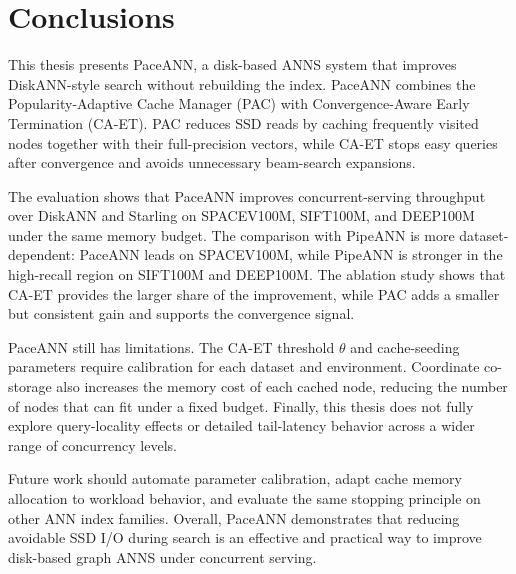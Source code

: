 \chapter{Conclusions}
\label{ch:conclusion}

This thesis presents PaceANN, a disk-based ANNS system that improves DiskANN-style search without rebuilding the index.
PaceANN combines the Popularity-Adaptive Cache Manager (PAC) with Convergence-Aware Early Termination (CA-ET).
PAC reduces SSD reads by caching frequently visited nodes together with their full-precision vectors, while CA-ET stops easy queries after convergence and avoids unnecessary beam-search expansions.

The evaluation shows that PaceANN improves concurrent-serving throughput over DiskANN and Starling on SPACEV100M, SIFT100M, and DEEP100M under the same memory budget.
The comparison with PipeANN is more dataset-dependent: PaceANN leads on SPACEV100M, while PipeANN is stronger in the high-recall region on SIFT100M and DEEP100M.
The ablation study shows that CA-ET provides the larger share of the improvement, while PAC adds a smaller but consistent gain and supports the convergence signal.

PaceANN still has limitations.
The CA-ET threshold $\theta$ and cache-seeding parameters require calibration for each dataset and environment.
Coordinate co-storage also increases the memory cost of each cached node, reducing the number of nodes that can fit under a fixed budget.
Finally, this thesis does not fully explore query-locality effects or detailed tail-latency behavior across a wider range of concurrency levels.

Future work should automate parameter calibration, adapt cache memory allocation to workload behavior, and evaluate the same stopping principle on other ANN index families.
Overall, PaceANN demonstrates that reducing avoidable SSD I/O during search is an effective and practical way to improve disk-based graph ANNS under concurrent serving.
